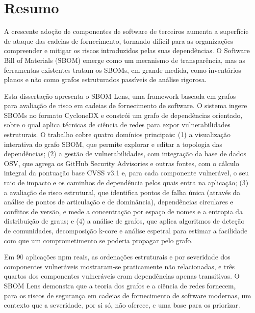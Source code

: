 \thispagestyle{plain}
\chapter*{Resumo}

A crescente adoção de componentes de software de terceiros aumenta a superfície de ataque das cadeias de fornecimento, tornando difícil para as organizações compreender e mitigar os riscos introduzidos pelas suas dependências. O Software Bill of Materials (SBOM) emerge como um mecanismo de transparência, mas as ferramentas existentes tratam os SBOMs, em grande medida, como inventários planos e não como grafos estruturados passíveis de análise rigorosa.

Esta dissertação apresenta o SBOM Lens, uma framework baseada em grafos para avaliação de risco em cadeias de fornecimento de software. O sistema ingere SBOMs no formato CycloneDX e constrói um grafo de dependências orientado, sobre o qual aplica técnicas de ciência de redes para expor vulnerabilidades estruturais. O trabalho cobre quatro domínios principais: (1) a visualização interativa do grafo SBOM, que permite explorar e editar a topologia das dependências; (2) a gestão de vulnerabilidades, com integração da base de dados OSV, que agrega os GitHub Security Advisories e outras fontes, com o cálculo integral da pontuação base CVSS v3.1 e, para cada componente vulnerável, o seu raio de impacto e os caminhos de dependência pelos quais entra na aplicação; (3) a avaliação de risco estrutural, que identifica pontos de falha única (através da análise de pontos de articulação e de dominância), dependências circulares e conflitos de versão, e mede a concentração por espaço de nomes e a entropia da distribuição de graus; e (4) a análise de grafos, que aplica algoritmos de deteção de comunidades, decomposição k-core e análise espetral para estimar a facilidade com que um comprometimento se poderia propagar pelo grafo.

Em 90 aplicações npm reais, as ordenações estruturais e por severidade dos componentes vulneráveis mostraram-se praticamente não relacionadas, e três quartos dos componentes vulneráveis eram dependências apenas transitivas. O SBOM Lens demonstra que a teoria dos grafos e a ciência de redes fornecem, para os riscos de segurança em cadeias de fornecimento de software modernas, um contexto que a severidade, por si só, não oferece, e uma base para os priorizar.


